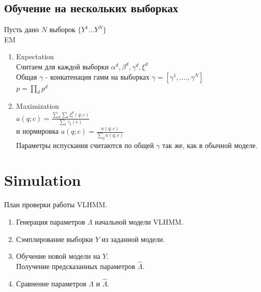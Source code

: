\documentclass{matmex-diploma-custom}
\begin{document}
\subsection{Обучение на нескольких выборках}
Пусть дано $ N $ выборок $ \{Y^{1} ... Y^{N}\}$
\\
EM
\begin{enumerate}
\item Expectation
\\
Считаем для каждой выборки  $\alpha^{d}, \beta^{d}, \gamma^{d}, \xi^{d}$
\\
Общая $\gamma$ - конкатенация гамм на выборках
$ \gamma = [\gamma^{1}, .... ,\gamma^{N}] $
\\
$ p = \prod_{d}{p^{d}}$
\item Maximization
\\
$ a(q;c) = \frac{\sum_{d}{\sum_{t}{\xi^{d}_{t}(q;c)}}}{\sum_{t}{\gamma_{t}(c)}} $
\\
и нормировка
$ a(q;c) = \frac{a(q;c)}{\sum_{q}{a(q;c)}} $
\\
Параметры испускания считаются по общей $ \gamma $ так же, как в обычной моделе.
\end{enumerate}

\section{Simulation}
План проверки работы VLHMM.
\begin{enumerate}

\item
Генерация параметров $ \Lambda $ начальной модели VLHMM.
\item
Сэмплирование выборки $ Y $ из заданной модели.
\item
Обучение новой модели на $ Y $. 
\\Получение предсказанных параметров $\hat{\Lambda}$.
\item
Сравнение параметров $ \Lambda $ и $ \hat{\Lambda} $.
\end{enumerate}
\end{document}
